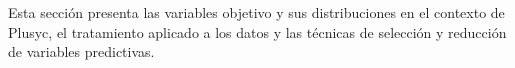Esta sección presenta las variables objetivo y sus distribuciones en el contexto de Plusyc, el tratamiento aplicado a los datos y las técnicas de selección y reducción de variables predictivas.

